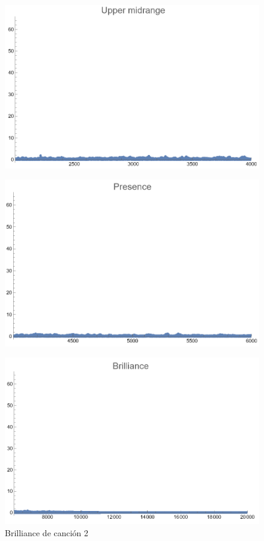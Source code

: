 \documentclass[12pt, letterpaper]{article}
\begin{document}
\begin{figure}[H]
  \centering
  \begin{minipage}{.5\textwidth}
    \centering
    \includegraphics[width=.9\linewidth]{imgs/Cancion2/upmid.png}
    \label{fig:02f}
  \end{minipage}%
  \begin{minipage}{.5\textwidth}
    \centering
    \includegraphics[width=.9\linewidth]{imgs/Cancion2/presence.png}
    \label{fig:02g}
  \end{minipage}
\end{figure}
\begin{figure}[H]
  \centering
  \includegraphics[width=.45\linewidth]{imgs/Cancion2/brilliance.png}
  \caption{Brilliance de canción 2}
  \label{fig:02h}
\end{figure}
\end{document}
